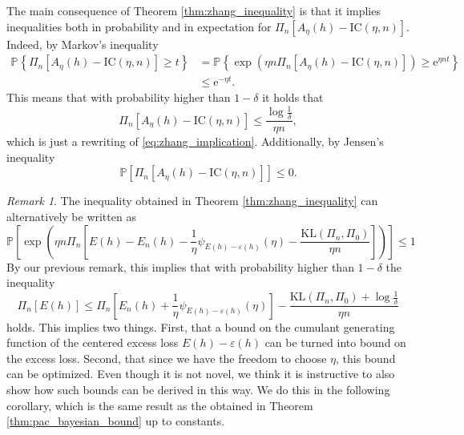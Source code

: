\documentclass{uvamath}
\newcommand*{\bbP}{\mathbb{P}}
\newcommand*{\prob}[2][]{\mathbb{P}_{#1}\left\{#2\right\}}
\newcommand*{\sqbrack}[1]{\left[#1\right]}
\newcommand*{\paren}[1]{\left(#1\right)}
\newcommand*{\rme}{\mathrm{e}}
\newcommand*{\KL}{\mathrm{KL}}
\newcommand*{\IC}{\mathrm{IC}}
\theoremstyle{remark}
\newtheorem{remark}[theorem]{Remark}
\theoremstyle{definition}
\theoremstyle{definition}
\theoremstyle{definition}
\theoremstyle{definition}
\theoremstyle{definition}
\begin{document}
The main consequence of Theorem \ref{thm:zhang_inequality} is that it
implies inequalities both in probability and in expectation for
$\Pi_n[A_{\eta}(h) - \IC(\eta, n)]$. Indeed, by Markov's inequality
\begin{align*}
  \prob{\Pi_n\sqbrack{A_\eta(h) - \IC(\eta,n)}\geq t}
  &=
    \prob{\exp\paren{\eta n \Pi_n\sqbrack{A_\eta(h) - \IC(\eta,n)}}\geq \rme^{\eta n
    t}}\\
  &\leq \rme^{-\eta t}.
\end{align*}
This means that with probability higher than $1-\delta$ it holds that
\begin{equation*}
  \Pi_n\sqbrack{A_\eta(h) - \IC(\eta,n)} \leq \frac{\log\frac{1}{\delta}}{\eta n},
\end{equation*}
which is just a rewriting of
\eqref{eq:zhang_implication}. Additionally, by Jensen's inequality
\begin{equation*}
  \bbP\sqbrack{\Pi_n\sqbrack{A_\eta(h) - \IC(\eta,n)}}\leq 0.
\end{equation*}

\begin{remark}\label{rem:zhang_interpretation}
  The inequality obtained in Theorem \ref{thm:zhang_inequality} can
  alternatively be written as
  \begin{equation}\label{eq:zhang_bound}
    \bbP\sqbrack{\exp\paren{\eta n\Pi_n\sqbrack{E(h) - E_n(h) -
          \frac{1}{\eta }\psi_{E(h) - \varepsilon(h)}(\eta) -
          \frac{\KL(\Pi_n, \Pi_0)}{\eta n}}}} \leq  1
  \end{equation}
  By our previous remark, this implies that with probability higher
  than $1-\delta$ the inequality
  \begin{equation*}
    \Pi_n[E(h)]
    \leq
    \Pi_n\sqbrack{E_n(h) +  \frac{1}{\eta }\psi_{E(h) - \varepsilon(h)}(\eta)} -
    \frac{\KL(\Pi_n, \Pi_0) + \log\frac{1}{\delta}}{\eta n}
  \end{equation*}
  holds. This implies two things. First, that a bound on the cumulant
  generating function of the centered excess loss
  $E(h) - \varepsilon(h)$ can be turned into bound on the excess
  loss. Second, that since we have the freedom to choose $\eta$, this
  bound can be optimized. Even though it is not novel, we think it is
  instructive to also show how such bounds can be derived in this
  way. We do this in the following corollary, which is the same result
  as the obtained in Theorem \ref{thm:pac_bayesian_bound} up to
  constants.
\end{remark}
\end{document}
